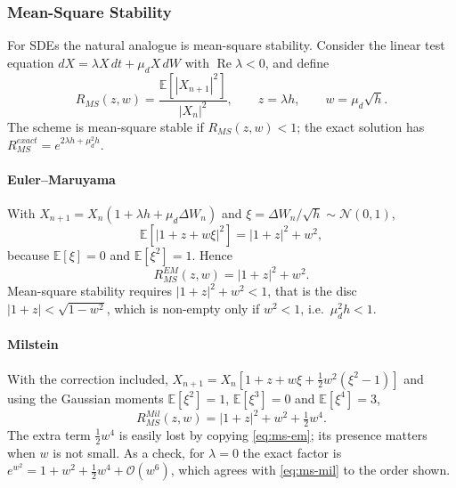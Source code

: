 \documentclass[11pt,a4paper]{article}
\theoremstyle{definition}
\theoremstyle{remark}
\begin{document}
\subsubsection{Mean-Square Stability}

For SDEs the natural analogue is mean-square stability. Consider the linear
test equation $dX = \lambda X\, dt + \mu_d X\, dW$ with
$\operatorname{Re}\lambda < 0$, and define
\begin{equation}
    R_{MS}(z, w) = \frac{\mathbb{E}\!\left[ |X_{n+1}|^2 \right]}{|X_n|^2},
    \qquad z = \lambda h, \qquad w = \mu_d \sqrt{h} .
    \label{eq:ms-definition}
\end{equation}
The scheme is mean-square stable if $R_{MS}(z,w) < 1$; the exact solution has
$R_{MS}^{exact} = e^{2\lambda h + \mu_d^2 h}$.

\paragraph{Euler--Maruyama}
With $X_{n+1} = X_n (1 + \lambda h + \mu_d \Delta W_n)$ and
$\xi = \Delta W_n / \sqrt{h} \sim \mathcal{N}(0,1)$,
\[
    \mathbb{E}\!\left[ |1 + z + w \xi|^2 \right] = |1 + z|^2 + w^2,
\]
because $\mathbb{E}[\xi] = 0$ and $\mathbb{E}[\xi^2] = 1$. Hence
\begin{equation}
    R_{MS}^{EM}(z, w) = |1 + z|^2 + w^2 .
    \label{eq:ms-em}
\end{equation}
Mean-square stability requires $|1 + z|^2 + w^2 < 1$, that is the disc
$|1 + z| < \sqrt{1 - w^2}$, which is non-empty only if $w^2 < 1$, i.e.\
$\mu_d^2 h < 1$.

\paragraph{Milstein}
With the correction included,
$X_{n+1} = X_n \left[ 1 + z + w \xi + \tfrac12 w^2 (\xi^2 - 1) \right]$ and
using the Gaussian moments $\mathbb{E}[\xi^2] = 1$, $\mathbb{E}[\xi^3] = 0$ and
$\mathbb{E}[\xi^4] = 3$,
\begin{equation}
    R_{MS}^{Mil}(z, w) = |1 + z|^2 + w^2 + \tfrac12 w^4 .
    \label{eq:ms-mil}
\end{equation}
The extra term $\tfrac12 w^4$ is easily lost by copying \eqref{eq:ms-em}; its
presence matters when $w$ is not small. As a check, for $\lambda = 0$ the exact
factor is $e^{w^2} = 1 + w^2 + \tfrac12 w^4 + \mathcal{O}(w^6)$, which agrees
with \eqref{eq:ms-mil} to the order shown.
\end{document}
